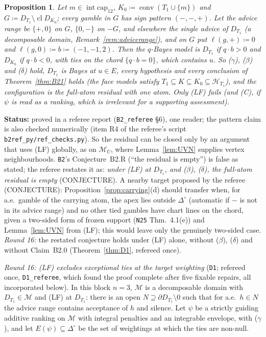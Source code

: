 \documentclass[11pt]{article}
\newtheorem{proposition}[theorem]{Proposition}
\theoremstyle{definition}
\theoremstyle{remark}
\newcommand{\Di}{\Delta^{\circ}}
\newcommand{\M}{\mathcal M}
\newcommand{\cl}{\operatorname{cl}}
\newcommand{\co}{\operatorname{conv}}
\newcommand{\src}[1]{\texttt{#1}}
\newcommand{\status}[1]{\par\smallskip\noindent\textbf{Status:} #1\par\smallskip}
\begin{document}
\begin{proposition}\label{prop:B2ex}
Let $m\in\operatorname{int}\mathrm{cap}_{12}$, $K_0\coloneqq\co(T_1\cup\{m\})$ and $G\coloneqq D_{T_1}\setminus\cl D_{K_0}$; every gamble in $G$ has sign pattern $(-,-,+)$. Let the advice range be $\{+,0\}$ on $G$, $\{0,-\}$ on $-G$, and elsewhere the single advice of $D_{T_1}$ (a decomposable domain, Remark~\ref{rem:advicerange}), and on $G$ put $\ell(g,+)\coloneqq0$ and $\ell(g,0)\coloneqq b\coloneqq(-1,-1,2)$. Then the $q$-Bayes model is $D_{T_1}$ if $q\cdot b>0$ and $D_{K_0}$ if $q\cdot b<0$, with ties on the chord $\{q\cdot b=0\}$, which contains $u$. So ($\gamma$), ($\beta$) and ($\delta$) hold, $D_{T_1}$ is Bayes at $u\in E$, every hypothesis and every conclusion of Theorem~\ref{thm:B21} holds (the face models satisfy $T_1\subseteq K\subseteq K_0\subseteq\mathcal H_{T_1}$), and the configuration is the full-atom residual with one atom. Only (LF) fails (and (C), if $\psi$ is read as a ranking, which is irrelevant for a supporting assessment).
\end{proposition}
\status{proved in a referee report (\src{B2\_referee} \S6), one reader; the pattern claim is also checked numerically (item R4 of the referee's script \src{b2ref\_py/ref\_checks.py}). So the residual can be closed only by an argument that uses (LF) globally, as on $\M_U$, where Lemma~\ref{lem:UVN} supplies vertex neighbourhoods. \src{B2}'s Conjecture~B2.R (``the residual is empty'') is false as stated; the referee restates it as: \emph{under (LF) at $D_{T_1}$, and ($\beta$), ($\delta$), the full-atom residual is empty} (CONJECTURE). A nearby target proposed by the referee (CONJECTURE): Proposition~\ref{prop:carrying}(d) should transfer when, for a.e.\ gamble of the carrying atom, the apex lies outside $\Di$ (automatic if $-$ is not in its advice range) and no other tied gambles have chart lines on the chord, given a two-sided form of frozen support (\src{N25} Thm.~4.1(e)) and Lemma~\ref{lem:UVN} from (LF); this would leave only the genuinely two-sided case. \emph{Round 16:} the restated conjecture holds under (LF) alone, without ($\beta$), ($\delta$) and without Claim~B2.0 (Theorem~\ref{thm:D1}, refereed once).}
\emph{Round 16: (LF) excludes exceptional ties at the target weighting} (\src{D1}; refereed once, \src{D1\_referee}, which found the proof complete after five fixable repairs, all incorporated below). In this block $n=3$, $\M$ is a decomposable domain with $D_{T_1}\in\M$ and (LF) at $D_{T_1}$: there is an open $N\supseteq\partial D_{T_1}\setminus0$ such that for a.e.\ $h\in N$ the advice range contains acceptance of $h$ and silence. Let $\psi$ be a strictly guiding additive ranking on $\M$ with integral penalties and an integrable envelope, with ($\gamma$), and let $E(\psi)\subseteq\Di$ be the set of weightings at which the ties are non-null.
\end{document}
